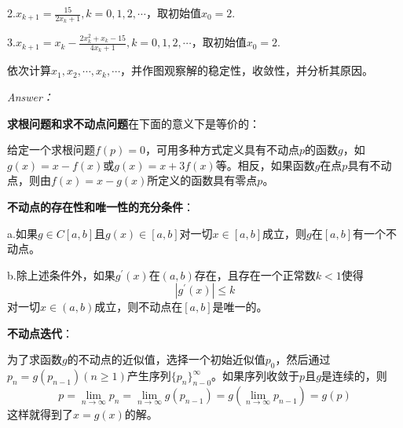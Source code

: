 \documentclass[12pt]{ctexart}
\begin{document}
	2.$x_{k+1}=\frac{15}{2x_k+1},k=0,1,2,\cdots$，取初始值$x_0=2$.
	
	3.$x_{k+1}=x_k-\frac{2x_k^2+x_k-15}{4x_k+1},k=0,1,2,\cdots$，取初始值$x_0=2$.
	
	依次计算$x_1,x_2,\cdots,x_k,\cdots$，并作图观察解的稳定性，收敛性，并分析其原因。
	
	\textit{Answer：}
	
	\textbf{求根问题和求不动点问题}在下面的意义下是等价的：
	
	给定一个求根问题$f(p)=0$，可用多种方式定义具有不动点$p$的函数$g$，如$g(x)=x-
	f(x)$或$g(x)=x+3f(x)$等。相反，如果函数$g$在点$p$具有不动点，则由$f(x)=x-g(x)$所定义的函数具有零点$p$。
	
	\textbf{不动点的存在性和唯一性的充分条件}：
	
	a.如果$g\in C[a,b]$且$g(x)\in[a,b]$对一切$x\in [a,b]$成立，则$g$在$[a,b]$有一个不动点。
	
	b.除上述条件外，如果$g^{'}(x)$在$(a,b)$存在，且存在一个正常数$k<1$使得$$|g^{'}(x)|\leq k$$对一切$x\in(a,b)$成立，则不动点在$[a,b]$是唯一的。
	
	\textbf{不动点迭代}：
	
	为了求函数$g$的不动点的近似值，选择一个初始近似值$p_0$，然后通过$p_n=g(p_{n-1})(n\geq 1)$产生序列$\{p_n\}_{n-0}^{\infty}$。如果序列收敛于$p$且$g$是连续的，则$$p=\lim\limits_{n\rightarrow\infty}p_n=\lim\limits_{n\rightarrow\infty}g(p_{n-1})=g(\lim\limits_{n\rightarrow\infty}p_{n-1})=g(p)$$这样就得到了$x=g(x)$的解。
	
\end{document}

